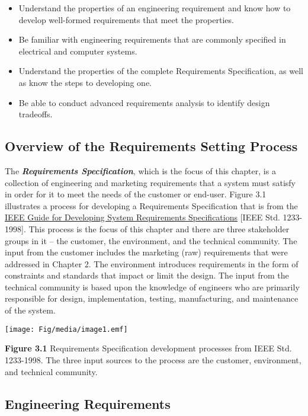 \begin{itemize}
\item
  Understand the properties of an engineering requirement and know how
  to develop well-formed requirements that meet the properties.
\item
  Be familiar with engineering requirements that are commonly specified
  in electrical and computer systems.
\item
  Understand the properties of the complete Requirements Specification,
  as well as know the steps to developing one.
\item
  Be able to conduct advanced requirements analysis to identify design
  tradeoffs.
\end{itemize}

\subsection{Overview of the Requirements Setting
Process}\label{overview-of-the-requirements-setting-process}

The \emph{\textbf{Requirements Specification}}, which is the focus of
this chapter, is a collection of engineering and marketing requirements
that a system must satisfy in order for it to meet the needs of the
customer or end-user. Figure 3.1 illustrates a process for developing a
Requirements Specification that is from the \ul{IEEE Guide for
Developing System Requirements Specifications} {[}IEEE Std.
1233-1998{]}. This process is the focus of this chapter and there are
three stakeholder groups in it -- the customer, the environment, and the
technical community. The input from the customer includes the marketing
(raw) requirements that were addressed in Chapter 2. The environment
introduces requirements in the form of constraints and standards that
impact or limit the design. The input from the technical community is
based upon the knowledge of engineers who are primarily responsible for
design, implementation, testing, manufacturing, and maintenance of the
system.

\texttt{[image: Fig/media/image1.emf]}

\textbf{Figure 3.1} Requirements Specification development processes
from IEEE Std. 1233-1998. The three input sources to the process are the
customer, environment, and technical community.

\subsection{Engineering Requirements}\label{engineering-requirements}

